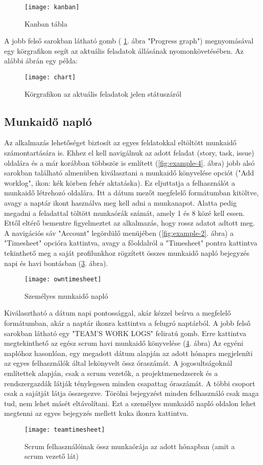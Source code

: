 \begin{figure}[H]
	\centering
	\texttt{[image: kanban]}
	\caption{Kanban tábla}
	\label{fig:kanban}
\end{figure}

A jobb felső sarokban látható gomb ( \ref{fig:kanban}. ábra "Progress graph") megnyomásával egy körgrafikon segít az aktuális feladatok állásának nyomonkövetésében. Az alábbi ábrán egy példa:

\begin{figure}[H]
	\centering
	\texttt{[image: chart]}
	\caption{Körgrafikon az aktuális feladatok jelen státuszáról}
	\label{fig:kanbanchart}
\end{figure}

\pagebreak

\subsection{Munkaidő napló}
\label{worklog}

Az alkalmazás lehetőséget biztosít az egyes feldatokkal eltöltött munkaidő számontartására is. Ehhez el kell navigálnuk az adott feladat (story, task, issue) oldalára és a már korábban többször is említett (\ref{fig:example-4}. ábra) jobb alsó sarokban található almenüben kiválasztani a munkaidő könyvelése opciót ("Add worklog", ikon: kék körben fehér aktatáska). Ez eljuttatja a felhasználót a munkaidő létrehozó oldalára. Itt a dátum mezőt megfelelő formátumban kitöltve, avagy a naptár ikont használva meg kell adni a munkanapot. Alatta pedig megadni a feladattal töltött munkaórák számát, amely 1 és 8 közé kell essen. Ettől eltérő bementre figyelmeztet az alkalmazás, hogy rossz adatot adtott meg. A navigációs sáv "Account" legördülő menüjében (\ref{fig:example-2}. ábra) a "Timesheet" opcióra kattintva, avagy a főoldalról a "Timesheet" pontra kattintva tekinthető meg a saját profilunkhoz rögzített összes munkaidő napló bejegyzés napi és havi bontásban (\ref{fig:personaltimesheet}. ábra).

\begin{figure}[H]
	\centering
	\texttt{[image: owntimesheet]}
	\caption{Személyes munkaidő napló}
	\label{fig:personaltimesheet}
\end{figure}

Kiválasztható a dátum napi pontossággal, akár kézzel beírva a megfelelő formátumban, akár a naptár ikonra kattintva a felugró naptárból. A jobb felső sarokban látható egy "TEAM'S WORK LOGS" feliratú gomb. Erre kattintva megtekinthető az egész scrum havi munkaidő könyvelése (\ref{fig:teamtimesheet}. ábra) Az egyéni naplóhoz hasonlóan, egy megadott dátum alapján az adott hónapra megjeleníti az egyes felhasználók által lekönyvelt össz óraszámát. A jogosultságoknál említettek alapján, csak a scrum vezetők, a projektmenedzserek és a rendszergazdák látják ténylegesen minden csapattag óraszámát. A többi csoport csak a sajátját látja összegezve. Törölni bejegyzést minden felhasználó csak maga tud, nem lehet másét eltávolítani. Ezt a személyes munkaidő napló oldalon lehet megtenni az egyes bejegyzés mellett kuka ikonra kattintva.

\begin{figure}[H]
	\centering
	\texttt{[image: teamtimesheet]}
	\caption{Scrum felhasználóinak össz munkaórája az adott hónapban (amit a scrum vezető lát)}
	\label{fig:teamtimesheet}
\end{figure}

\newpage
